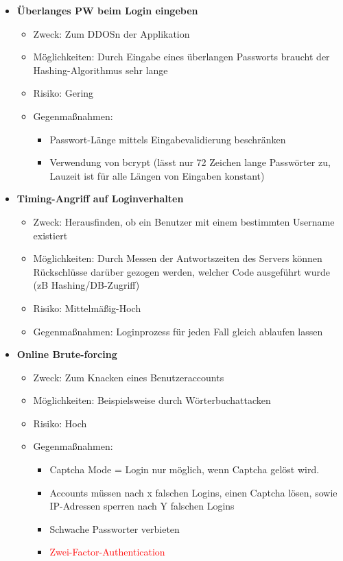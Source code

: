 \documentclass[12pt,DIV14,BCOR10mm,a4paper,twoside,parskip=half-,headsepline,headinclude,english,ngerman,bibliography=totocnumbered]{scrreprt}
\begin{document}
\begin{itemize}
  \item \textbf{Überlanges PW beim Login eingeben}
  \begin{itemize}
  \item Zweck: Zum DDOSn der Applikation
  \item Möglichkeiten: Durch Eingabe eines überlangen Passworts braucht der Hashing-Algorithmus sehr lange
  \item Risiko: Gering
  \item Gegenmaßnahmen: 
  \begin{itemize}
  \item Passwort-Länge mittels Eingabevalidierung beschränken
  \item Verwendung von bcrypt (lässt nur 72 Zeichen lange Passwörter zu, Lauzeit ist für alle Längen von Eingaben konstant)  
  \end{itemize}
\end{itemize}

  \item \textbf{Timing-Angriff auf Loginverhalten}
  \begin{itemize}
  \item Zweck: Herausfinden, ob ein Benutzer mit einem bestimmten Username existiert
  \item Möglichkeiten: Durch Messen der Antwortszeiten des Servers können Rückschlüsse darüber gezogen werden, welcher Code ausgeführt wurde (zB Hashing/DB-Zugriff)
  \item Risiko: Mittelmäßig-Hoch
  \item Gegenmaßnahmen: Loginprozess für jeden Fall gleich ablaufen lassen
  \end{itemize}

  \item \textbf{Online Brute-forcing}
  \begin{itemize}
  \item Zweck: Zum Knacken eines Benutzeraccounts
  \item Möglichkeiten: Beispielsweise durch Wörterbuchattacken
  \item Risiko: Hoch
  \item Gegenmaßnahmen:
  \begin{itemize}
      \item Captcha Mode = Login nur möglich, wenn Captcha gelöst wird.
      \item Accounts müssen nach x falschen Logins, einen Captcha lösen, sowie IP-Adressen sperren nach Y falschen Logins
      \item Schwache Passworter verbieten
      \item \textcolor{red}{Zwei-Factor-Authentication} %
    \end{itemize}
  \end{itemize}
\end{itemize}
\end{document}
